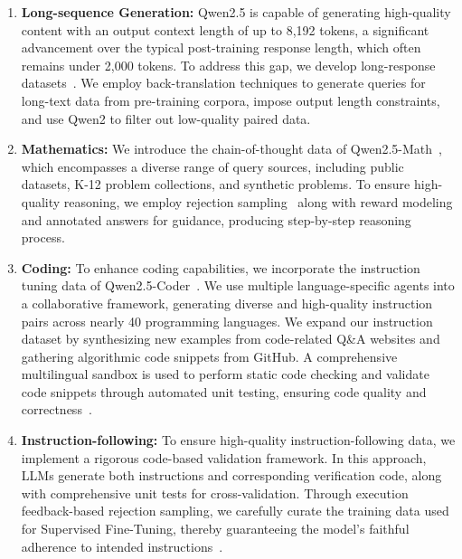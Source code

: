 \documentclass{article}
\begin{document}
\begin{enumerate}[label=(\arabic*)]

    \item \textbf{Long-sequence Generation:} 
    Qwen2.5 is capable of generating high-quality content with an output context length of up to 8,192 tokens, a significant advancement over the typical post-training response length, which often remains under 2,000 tokens. To address this gap, we develop long-response datasets~\citep{quan2024language}. We employ back-translation techniques to generate queries for long-text data from pre-training corpora, impose output length constraints, and use Qwen2 to filter out low-quality paired data.

    \item \textbf{Mathematics:} 
    We introduce the chain-of-thought data of Qwen2.5-Math~\citep{qwen2.5math}, which encompasses a diverse range of query sources, including public datasets, K-12 problem collections, and synthetic problems. To ensure high-quality reasoning, we employ rejection sampling~\citep{yuan2023scaling} along with reward modeling and annotated answers for guidance, producing step-by-step reasoning process.

    \item \textbf{Coding:} 
    To enhance coding capabilities, we incorporate the instruction tuning data of Qwen2.5-Coder~\citep{qwen2.5coder}. We use multiple language-specific agents into a collaborative framework, generating diverse and high-quality instruction pairs across nearly 40 programming languages. 
    We expand our instruction dataset by synthesizing new examples from code-related Q\&A websites and gathering algorithmic code snippets from GitHub. A comprehensive multilingual sandbox is used to perform static code checking and validate code snippets through automated unit testing, ensuring code quality and correctness~\citep{dou2024multi,yang2024evaluating}.
    
    \item \textbf{Instruction-following: } 
    To ensure high-quality instruction-following data, we implement a rigorous code-based validation framework. In this approach, LLMs generate both instructions and corresponding verification code, along with comprehensive unit tests for cross-validation. Through execution feedback-based rejection sampling, we carefully curate the training data used for Supervised Fine-Tuning, thereby guaranteeing the model's faithful adherence to intended instructions~\citep{dong2024autoif}.
    

\end{enumerate}
\end{document}

